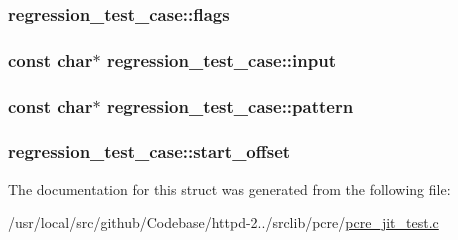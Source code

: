 \subsubsection[{\texorpdfstring{flags}{flags}}]{ regression\+\_\+test\+\_\+case\+::flags}\hypertarget{structregression__test__case_a0f4c8efb9e0ff97652926c31e2fb4579}{}\label{structregression__test__case_a0f4c8efb9e0ff97652926c31e2fb4579}
\subsubsection[{\texorpdfstring{input}{input}}]{\setlength{\rightskip}{0pt plus 5cm}const char$\ast$ regression\+\_\+test\+\_\+case\+::input}\hypertarget{structregression__test__case_ad8071e82f7a35dd430bbb43da66ea44e}{}\label{structregression__test__case_ad8071e82f7a35dd430bbb43da66ea44e}
\subsubsection[{\texorpdfstring{pattern}{pattern}}]{\setlength{\rightskip}{0pt plus 5cm}const char$\ast$ regression\+\_\+test\+\_\+case\+::pattern}\hypertarget{structregression__test__case_afe682a8f69ae51686321c172e8f6cfd7}{}\label{structregression__test__case_afe682a8f69ae51686321c172e8f6cfd7}
\subsubsection[{\texorpdfstring{start\+\_\+offset}{start_offset}}]{ regression\+\_\+test\+\_\+case\+::start\+\_\+offset}\hypertarget{structregression__test__case_aa1ffb94a5765c8f2ad60267e6ed9d1ce}{}\label{structregression__test__case_aa1ffb94a5765c8f2ad60267e6ed9d1ce}


The documentation for this struct was generated from the following file\+:\begin{DoxyCompactItemize}
\item 
/usr/local/src/github/\+Codebase/httpd-\/2../srclib/pcre/\hyperlink{pcre__jit__test_8c}{pcre\+\_\+jit\+\_\+test.\+c}\end{DoxyCompactItemize}
